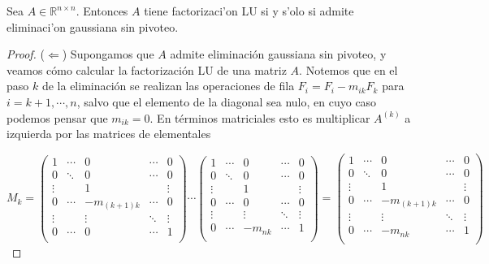 \begin{propo}
	Sea $A \in \mathbb{R}^{n \times n}$. Entonces $A$ tiene factorizaci'on LU si y s'olo si admite eliminaci'on gaussiana sin pivoteo.

	\begin{proof}

($\Leftarrow$) Supongamos que $A$ admite eliminación gaussiana sin pivoteo, y veamos cómo calcular la factorización LU de una matriz $A$. Notemos que en el paso $k$ de la eliminación se realizan las operaciones de fila $F_i = F_i - m_{ik} F_k$ para $i = k + 1, \cdots, n$, salvo que el elemento de la diagonal sea nulo, en cuyo caso podemos pensar que $m_{ik} = 0$. En términos matriciales esto es multiplicar $A^{(k)}$ a izquierda por las matrices de elementales

\[
M_k =
\begin{pmatrix}
1 		& \cdots 	& 0 				& \cdots 	& 0 \\
0 		& \ddots 	& 0 				& \cdots 	& 0 \\
\vdots 	& 			& 1 				& 			& \vdots\\
0		& \cdots		& -m_{(k+1)k} 	& \cdots		& 0\\
\vdots	& 			& \vdots		 	& \ddots		& \vdots\\
0		& \cdots		& 0				& \cdots		& 1\\
\end{pmatrix}
\cdots
\begin{pmatrix}
1 		& \cdots 	& 0 				& \cdots 	& 0 \\
0 		& \ddots 	& 0 				& \cdots 	& 0 \\
\vdots 	& 			& 1 				& 			& \vdots\\
0		& \cdots		& 0 	& \cdots		& 0\\
\vdots	& 			& \vdots		 	& \ddots		& \vdots\\
0		& \cdots		& -m_{nk}	& \cdots		& 1\\
\end{pmatrix}
=
\begin{pmatrix}
1 		& \cdots 	& 0 				& \cdots 	& 0 \\
0 		& \ddots 	& 0 				& \cdots 	& 0 \\
\vdots 	& 			& 1 				& 			& \vdots\\
0		& \cdots		& -m_{(k+1)k} 	& \cdots		& 0\\
\vdots	& 			& \vdots		 	& \ddots		& \vdots\\
0		& \cdots		& -m_{nk}	& \cdots		& 1\\
\end{pmatrix}
\]


\end{proof}
\end{propo}
